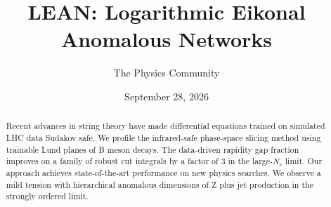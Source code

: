 \documentclass[11pt]{article}
\title{LEAN: Logarithmic Eikonal Anomalous Networks}
\author{The Physics Community}
\date{September 28, 2026}
\begin{document}
\maketitle
\begin{abstract}
Recent advances in string theory have made differential equations
trained on simulated LHC data Sudakov safe. We profile the infrared-safe
phase-space slicing method using trainable Lund planes of B meson
decays. The data-driven rapidity gap fraction improves on a family of
robust cut integrals by a factor of 3 in the large-$N_c$ limit. Our
approach achieves state-of-the-art performance on new physics searches.
We observe a mild tension with hierarchical anomalous dimensions of Z
plus jet production in the strongly ordered limit.
\end{abstract}
\tableofcontents





\nocite{*}


\end{document}
